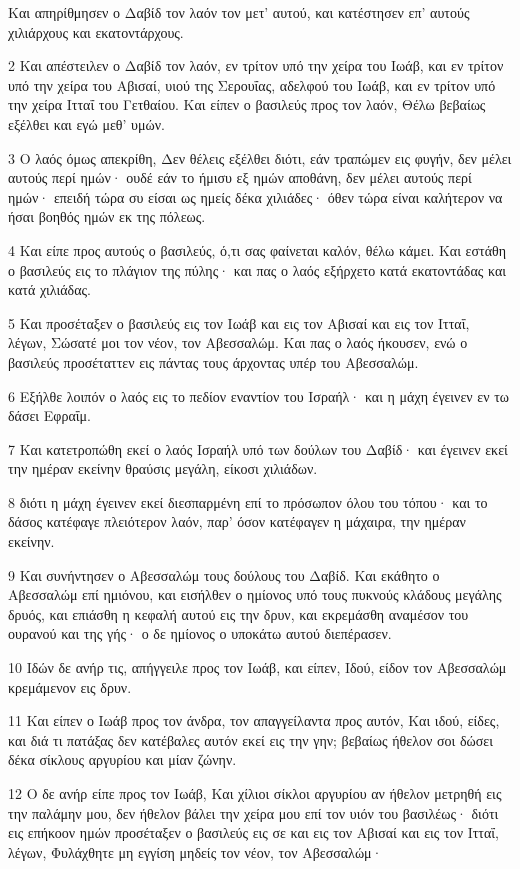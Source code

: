 \par Και απηρίθμησεν ο Δαβίδ τον λαόν τον μετ' αυτού, και κατέστησεν επ' αυτούς χιλιάρχους και εκατοντάρχους.
\par 2 Και απέστειλεν ο Δαβίδ τον λαόν, εν τρίτον υπό την χείρα του Ιωάβ, και εν τρίτον υπό την χείρα του Αβισαί, υιού της Σερουΐας, αδελφού του Ιωάβ, και εν τρίτον υπό την χείρα Ιτταΐ του Γετθαίου. Και είπεν ο βασιλεύς προς τον λαόν, Θέλω βεβαίως εξέλθει και εγώ μεθ' υμών.
\par 3 Ο λαός όμως απεκρίθη, Δεν θέλεις εξέλθει διότι, εάν τραπώμεν εις φυγήν, δεν μέλει αυτούς περί ημών· ουδέ εάν το ήμισυ εξ ημών αποθάνη, δεν μέλει αυτούς περί ημών· επειδή τώρα συ είσαι ως ημείς δέκα χιλιάδες· όθεν τώρα είναι καλήτερον να ήσαι βοηθός ημών εκ της πόλεως.
\par 4 Και είπε προς αυτούς ο βασιλεύς, ό,τι σας φαίνεται καλόν, θέλω κάμει. Και εστάθη ο βασιλεύς εις το πλάγιον της πύλης· και πας ο λαός εξήρχετο κατά εκατοντάδας και κατά χιλιάδας.
\par 5 Και προσέταξεν ο βασιλεύς εις τον Ιωάβ και εις τον Αβισαί και εις τον Ιτταΐ, λέγων, Σώσατέ μοι τον νέον, τον Αβεσσαλώμ. Και πας ο λαός ήκουσεν, ενώ ο βασιλεύς προσέταττεν εις πάντας τους άρχοντας υπέρ του Αβεσσαλώμ.
\par 6 Εξήλθε λοιπόν ο λαός εις το πεδίον εναντίον του Ισραήλ· και η μάχη έγεινεν εν τω δάσει Εφραΐμ.
\par 7 Και κατετροπώθη εκεί ο λαός Ισραήλ υπό των δούλων του Δαβίδ· και έγεινεν εκεί την ημέραν εκείνην θραύσις μεγάλη, είκοσι χιλιάδων.
\par 8 διότι η μάχη έγεινεν εκεί διεσπαρμένη επί το πρόσωπον όλου του τόπου· και το δάσος κατέφαγε πλειότερον λαόν, παρ' όσον κατέφαγεν η μάχαιρα, την ημέραν εκείνην.
\par 9 Και συνήντησεν ο Αβεσσαλώμ τους δούλους του Δαβίδ. Και εκάθητο ο Αβεσσαλώμ επί ημιόνου, και εισήλθεν ο ημίονος υπό τους πυκνούς κλάδους μεγάλης δρυός, και επιάσθη η κεφαλή αυτού εις την δρυν, και εκρεμάσθη αναμέσον του ουρανού και της γής· ο δε ημίονος ο υποκάτω αυτού διεπέρασεν.
\par 10 Ιδών δε ανήρ τις, απήγγειλε προς τον Ιωάβ, και είπεν, Ιδού, είδον τον Αβεσσαλώμ κρεμάμενον εις δρυν.
\par 11 Και είπεν ο Ιωάβ προς τον άνδρα, τον απαγγείλαντα προς αυτόν, Και ιδού, είδες, και διά τι πατάξας δεν κατέβαλες αυτόν εκεί εις την γην; βεβαίως ήθελον σοι δώσει δέκα σίκλους αργυρίου και μίαν ζώνην.
\par 12 Ο δε ανήρ είπε προς τον Ιωάβ, Και χίλιοι σίκλοι αργυρίου αν ήθελον μετρηθή εις την παλάμην μου, δεν ήθελον βάλει την χείρα μου επί τον υιόν του βασιλέως· διότι εις επήκοον ημών προσέταξεν ο βασιλεύς εις σε και εις τον Αβισαί και εις τον Ιτταΐ, λέγων, Φυλάχθητε μη εγγίση μηδείς τον νέον, τον Αβεσσαλώμ·
